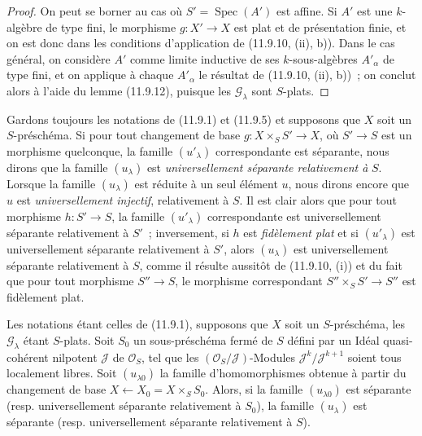 \begin{proof}
On peut se borner au cas où $S'=\operatorname{Spec}(A')$ est affine. Si $A'$
est une $k$-algèbre de type fini, le morphisme $g:X'\to X$ est plat et de
présentation finie, et on est donc dans les conditions d'application de
(11.9.10, (ii), b)). Dans le cas général, on considère $A'$ comme limite
inductive de ses $k$-sous-algèbres $A'_\alpha$ de type fini, et on applique à
chaque $A'_\alpha$ le résultat de (11.9.10, (ii), b))~; on conclut alors à
l'aide du lemme (11.9.12), puisque les $\mathcal G_\lambda$ sont $S$-plats.
\end{proof}

\begin{env}[11.9.14]
\label{IV.11.9.14-fr}
Gardons toujours les notations de (11.9.1) et (11.9.5) et supposons que $X$
soit un $S$-préschéma. Si pour tout changement de base
$g:X\times_S S'\to X$, où $S'\to S$ est un morphisme quelconque, la famille
$(u'_\lambda)$ correspondante est séparante, nous dirons que la famille
$(u_\lambda)$ est \emph{universellement séparante relativement à} $S$.
Lorsque la famille $(u_\lambda)$ est réduite à un seul élément $u$, nous
dirons encore que $u$ est \emph{universellement injectif}, relativement à
$S$. Il est clair alors que pour tout morphisme $h:S'\to S$, la famille
$(u'_\lambda)$ correspondante est universellement séparante relativement à
$S'$~; inversement, si $h$ est \emph{fidèlement plat} et si $(u'_\lambda)$ est
universellement séparante relativement à $S'$, alors $(u_\lambda)$ est
universellement séparante relativement à $S$, comme il résulte aussitôt de
(11.9.10, (i)) et du fait que pour tout morphisme $S''\to S$, le morphisme
correspondant $S''\times_S S'\to S''$ est fidèlement plat.
\end{env}


\begin{proposition}[11.9.15]
\label{IV.11.9.15-fr}
Les notations étant celles de (11.9.1), supposons que $X$ soit un
$S$-préschéma, les $\mathcal G_\lambda$ étant $S$-plats. Soit $S_0$ un
sous-préschéma fermé de $S$ défini par un Idéal quasi-cohérent nilpotent
$\mathcal J$ de $\mathcal O_S$, tel que les
$(\mathcal O_S/\mathcal J)$-Modules $\mathcal J^k/\mathcal J^{k+1}$ soient
tous localement libres. Soit $(u_{\lambda0})$ la famille d'homomorphismes
obtenue à partir du changement de base
$X\leftarrow X_0=X\times_S S_0$. Alors, si la famille $(u_{\lambda0})$ est
séparante (resp. universellement séparante relativement à $S_0$), la famille
$(u_\lambda)$ est séparante (resp. universellement séparante relativement à
$S$).
\end{proposition}

